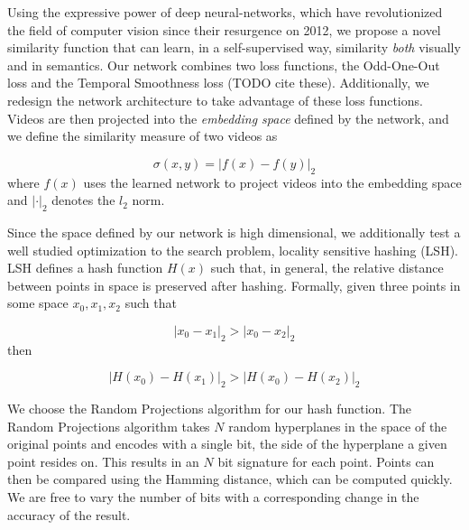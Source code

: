 Using the expressive power of deep neural-networks, which have revolutionized the field of computer vision since their resurgence on 2012, we propose a novel similarity function that can learn, in a self-supervised way, similarity \textit{both} visually and in semantics. Our network combines two loss functions, the Odd-One-Out loss and the Temporal Smoothness loss (TODO cite these). Additionally, we redesign the network architecture to take advantage of these loss functions. Videos are then projected into the \textit{embedding space} defined by the network, and we define the similarity measure of two videos as 

\begin{equation*}
\sigma(x, y) =|f(x) - f(y)|_2
\end{equation*}
where $f(x)$ uses the learned network to project videos into the embedding space and $|\cdot|_2$ denotes the $l_2$ norm. 

Since the space defined by our network is high dimensional, we additionally test a well studied optimization to the search problem, locality sensitive hashing (LSH). LSH defines a hash function $H(x)$ such that, in general, the relative distance between points in space is preserved after hashing. Formally, given three points in some space $x_0, x_1, x_2$ such that 

\begin{equation*}
|x_0 - x_1|_2 > |x_0 - x_2|_2
\end{equation*}
then

\begin{equation*}
|H(x_0) - H(x_1)|_2 > |H(x_0) - H(x_2)|_2
\end{equation*}

We choose the Random Projections algorithm for our hash function. The Random Projections algorithm takes $N$ random hyperplanes in the space of the original points and encodes with a single bit, the side of the hyperplane a given point resides on. This results in an $N$ bit signature for each point. Points can then be compared using the Hamming distance, which can be computed quickly. We are free to vary the number of bits with a corresponding change in the accuracy of the result.
